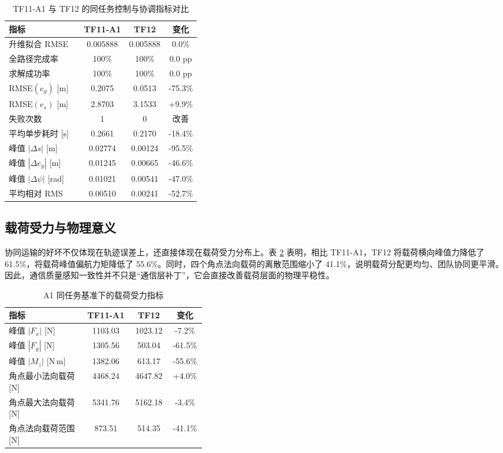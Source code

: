 \documentclass[twocolumn,3p,times,procedia]{elsarticle}
\newcommand{\tfone}{TF11-A1}
\newcommand{\tftwo}{TF12}
\begin{document}
\begin{table}[h]
\footnotesize
\centering
\begin{threeparttable}
\setlength{\abovecaptionskip}{0pt}
\caption{\tfone{} 与 \tftwo{} 的同任务控制与协调指标对比}
\label{tab:zh_control_results}
\begin{tabular}{p{0.39\linewidth} c c c}
\toprule
指标 & \tfone{} & \tftwo{} & 变化 \\
\midrule
升维拟合 RMSE & 0.005888 & 0.005888 & 0.0\% \\
全路径完成率 & 100\% & 100\% & 0.0 pp \\
求解成功率 & 100\% & 100\% & 0.0 pp \\
RMSE$(e_y)$ [m] & 0.2075 & 0.0513 & -75.3\% \\
RMSE$(e_s)$ [m] & 2.8703 & 3.1533 & +9.9\% \\
失败次数 & 1 & 0 & 改善 \\
平均单步耗时 [s] & 0.2661 & 0.2170 & -18.4\% \\
峰值 $|\Delta s|$ [m] & 0.02774 & 0.00124 & -95.5\% \\
峰值 $|\Delta e_y|$ [m] & 0.01245 & 0.00665 & -46.6\% \\
峰值 $|\Delta \psi|$ [rad] & 0.01021 & 0.00541 & -47.0\% \\
平均相对 RMS & 0.00510 & 0.00241 & -52.7\% \\
\bottomrule
\end{tabular}
\end{threeparttable}
\end{table}

\subsection{载荷受力与物理意义}
协同运输的好坏不仅体现在轨迹误差上，还直接体现在载荷受力分布上。表 \ref{tab:zh_payload_results} 表明，相比 \tfone{}，\tftwo{} 将载荷横向峰值力降低了 61.5\%，将载荷峰值偏航力矩降低了 55.6\%。同时，四个角点法向载荷的离散范围缩小了 41.1\%，说明载荷分配更均匀、团队协同更平滑。因此，通信质量感知一致性并不只是“通信层补丁”，它会直接改善载荷层面的物理平稳性。

\begin{table}[h]
\footnotesize
\centering
\begin{threeparttable}
\setlength{\abovecaptionskip}{0pt}
\caption{A1 同任务基准下的载荷受力指标}
\label{tab:zh_payload_results}
\begin{tabular}{p{0.39\linewidth} c c c}
\toprule
指标 & \tfone{} & \tftwo{} & 变化 \\
\midrule
峰值 $|F_x|$ [N] & 1103.03 & 1023.12 & -7.2\% \\
峰值 $|F_y|$ [N] & 1305.56 & 503.04 & -61.5\% \\
峰值 $|M_z|$ [N\,m] & 1382.06 & 613.17 & -55.6\% \\
角点最小法向载荷 [N] & 4468.24 & 4647.82 & +4.0\% \\
角点最大法向载荷 [N] & 5341.76 & 5162.18 & -3.4\% \\
角点法向载荷范围 [N] & 873.51 & 514.35 & -41.1\% \\
\bottomrule
\end{tabular}
\end{threeparttable}
\end{table}
\end{document}
